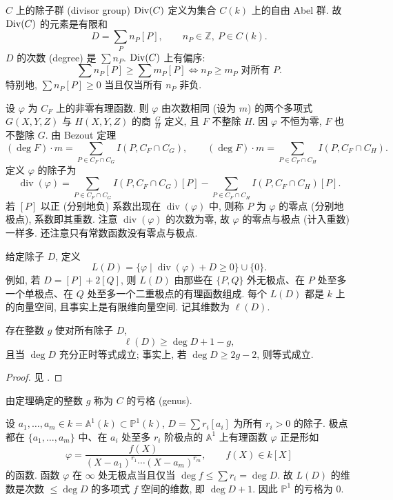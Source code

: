 $C$ 上的除子群 (divisor group) $\operatorname{Div}(C)$ 定义为集合 $C(k)$ 上的自由 Abel 群. 故 $\operatorname{Div}(C)$ 的元素是有限和
\[
D = \sum_{P} n_P[P], \qquad n_P\in\mathbb{Z},\ P\in C(k).
\]
$D$ 的次数 (degree) 是 $\sum n_P$. $\operatorname{Div}(C)$ 上有偏序:
\[
\sum n_P[P]\ge\sum m_P[P] \iff n_P\ge m_P \text{ 对所有 } P.
\]
特别地, $\sum n_P[P]\ge 0$ 当且仅当所有 $n_P$ 非负.

设 $\varphi$ 为 $C_F$ 上的非零有理函数. 则 $\varphi$ 由次数相同 (设为 $m$) 的两个多项式 $G(X,Y,Z)$ 与 $H(X,Y,Z)$ 的商 $\frac{G}{H}$ 定义, 且 $F$ 不整除 $H$. 因 $\varphi$ 不恒为零, $F$ 也不整除 $G$. 由 Bezout 定理
\[
(\deg F)\cdot m = \sum_{P\in C_F\cap C_G} I(P, C_F\cap C_G), \qquad
(\deg F)\cdot m = \sum_{P\in C_F\cap C_H} I(P, C_F\cap C_H).
\]
定义 $\varphi$ 的除子为
\[
\operatorname{div}(\varphi) = \sum_{P\in C_F\cap C_G} I(P, C_F\cap C_G)[P] - \sum_{P\in C_F\cap C_H} I(P, C_F\cap C_H)[P].
\]
若 $[P]$ 以正 (分别地负) 系数出现在 $\operatorname{div}(\varphi)$ 中, 则称 $P$ 为 $\varphi$ 的零点 (分别地极点), 系数即其重数. 注意 $\operatorname{div}(\varphi)$ 的次数为零, 故 $\varphi$ 的零点与极点 (计入重数) 一样多. 还注意只有常数函数没有零点与极点.

给定除子 $D$, 定义
\[
L(D) = \{\varphi \mid \operatorname{div}(\varphi) + D\ge 0\}\cup\{0\}.
\]
例如, 若 $D = [P] + 2[Q]$, 则 $L(D)$ 由那些在 $\{P,Q\}$ 外无极点、在 $P$ 处至多一个单极点、在 $Q$ 处至多一个二重极点的有理函数组成. 每个 $L(D)$ 都是 $k$ 上的向量空间, 且事实上是有限维向量空间. 记其维数为 $\ell(D)$.

\begin{theorem} \label{thm:1.4.5} 
存在整数 $g$ 使对所有除子 $D$,
\[
\ell(D)\ge\deg D + 1 - g,
\]
且当 $\deg D$ 充分正时等式成立; 事实上, 若 $\deg D\ge 2g-2$, 则等式成立.
\end{theorem}

\begin{proof}
见 \cite[Chap. 8]{fulton1969}.
\end{proof}

由定理确定的整数 $g$ 称为 $C$ 的亏格 (genus).

\begin{example} \label{thm:1.4.6} 
设 $a_1,\dots,a_m\in k = \mathbb{A}^1(k)\subset\mathbb{P}^1(k)$, $D = \sum r_i[a_i]$ 为所有 $r_i > 0$ 的除子. 极点都在 $\{a_1,\dots,a_m\}$ 中、在 $a_i$ 处至多 $r_i$ 阶极点的 $\mathbb{A}^1$ 上有理函数 $\varphi$ 正是形如
\[
\varphi = \frac{f(X)}{(X-a_1)^{r_1}\cdots(X-a_m)^{r_m}}, \qquad f(X)\in k[X]
\]
的函数. 函数 $\varphi$ 在 $\infty$ 处无极点当且仅当 $\deg f\le\sum r_i = \deg D$. 故 $L(D)$ 的维数是次数 $\le\deg D$ 的多项式 $f$ 空间的维数, 即 $\deg D + 1$. 因此 $\mathbb{P}^1$ 的亏格为 $0$.
\end{example}

